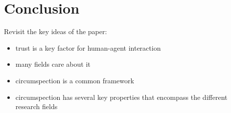 \section{Conclusion}
    Revisit the key ideas of the paper:

    \begin{itemize}
        \item trust is a key factor for human-agent interaction
        \item many fields care about it
        \item circumspection is a common framework
        \item circumspection has several key properties that encompass the different research fields
    \end{itemize}

\newpage

